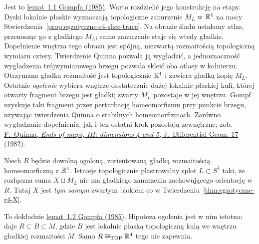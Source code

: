 Jest to \href{https://doi.org/10.4310/jdg/1214439566}
{lemat~1.1 Gompfa (1985)}. Warto rozdzielić
jego konstrukcję na etapy. Dyski lokalnie płaskie
wyznaczają topologiczne zanurzenie $M_L$ w
$\mathbb{R}^4$ na mocy
Stwierdzenia~\ref{prop:egzotyczne-r4-slice-trace}.
Na obrazie śladu ustalamy atlas, przenosząc go
z gładkiego $M_L$; samo zanurzenie staje się wtedy
gładkie. Dopełnienie wnętrza tego obrazu jest
spójną, niezwartą rozmaitością topologiczną
wymiaru cztery. Twierdzenie Quinna pozwala ją
wygładzić, a jednoznaczność wygładzenia
trójwymiarowego brzegu pozwala skleić oba atlasy
w kołnierzu. Otrzymana gładka rozmaitość jest
topologicznie $\mathbb{R}^4$ i zawiera gładką kopię $M_L$.
Ostatnie \emph{ogolenie} wybiera wnętrze
dostatecznie dużej lokalnie płaskiej kuli,
której otwarty fragment brzegu jest gładki;
zwarty $M_L$ pozostaje w jej wnętrzu.
Gompf uzyskuje taki fragment przez perturbację
homeomorfizmu przy punkcie brzegu, używając
twierdzenia Quinna o stabilnych homeomorfizmach.
Zarówno wygładzanie dopełnienia, jak i ten
ostatni krok pozostają zewnętrzne; zob.
\href{https://www.maths.gla.ac.uk/~mpowell/1982_Ends%20of%20maps%20III.pdf}
{F.~Quinna, \emph{Ends of maps, III: dimensions
4 and 5}, J.~Differential Geom. 17 (1982)}.

\begin{twierdzenie}
\label{thm:egzotyczne-r4-lemat}
Niech $R$ będzie dowolną ogoloną, zorientowaną
gładką rozmaitością homeomorficzną z $\mathbb{R}^4$.
Istnieje topologicznie plastrowalny splot
$L\subset S^3$ taki, że rozłączna suma
$X\sqcup M_L$ nie ma gładkiego zanurzenia
zachowującego orientację w $R$. Tutaj $X$
jest \emph{tym samym} zwartym blokiem co w
Twierdzeniu~\ref{thm:egzotyczne-r4-X}.
\end{twierdzenie}

To dokładnie \href{https://doi.org/10.4310/jdg/1214439566}
{lemat~1.2 Gompfa (1985)}. Hipoteza ogolenia
jest w nim istotna: daje $R\subset B\subset M$,
gdzie $B$ jest lokalnie płaską topologiczną kulą
we wnętrzu gładkiej rozmaitości $M$. Samo
$R\cong_{\mathrm{TOP}}\mathbb{R}^4$ tego nie zapewnia.

